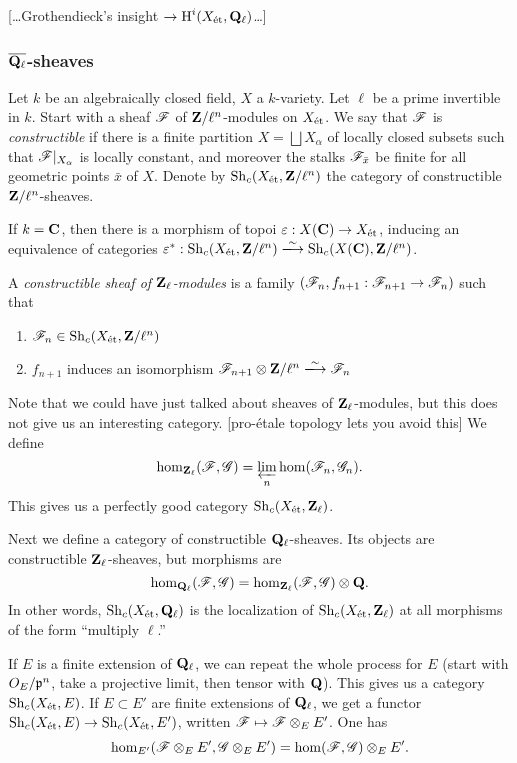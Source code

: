 [\ldots Grothendieck's insight $\to\operatorname{H}^i(X_{\textnormal{\'et}}, \mathbf{Q}_\ell)$\ldots]


\subsubsection{\texorpdfstring{$\overline{\mathbf{Q}_\ell}$}{barQl}-sheaves}

Let $k$ be an algebraically closed field, $X$ a $k$-variety. Let $\ell$ be 
a prime invertible in $k$. Start with a sheaf $\mathscr{F}$ of 
$\mathbf{Z}/\ell^n$-modules on $X_{\textnormal{\'et}}$. We say that $\mathscr{F}$ is \emph{constructible} 
if there is a finite partition $X=\bigsqcup X_\alpha$ of locally closed 
subsets such that $\mathscr{F}|_{X_\alpha}$ is locally constant, and moreover 
the stalks $\mathscr{F}_{\bar x}$ be finite for all geometric points $\bar x$ of $X$. 
Denote by $\operatorname{Sh}_c(X_{\textnormal{\'et}}, \mathbf{Z}/\ell^n)$ the category of constructible 
$\mathbf{Z}/\ell^n$-sheaves. 

If $k=\mathbf{C}$, then there is a morphism of topoi $\varepsilon:X(\mathbf{C}) \to X_{\textnormal{\'et}}$, 
inducing an equivalence of categories 
$\varepsilon^\ast:\sheaf_c(X_\etale,\dZ/\ell^n)\isomorphism \sheaf_c(X(\dC),\dZ/\ell^n)$. 

A \emph{constructible sheaf of $\mathbf{Z}_\ell$-modules} is a family 
$(\mathscr{F}_n,f_{n+1}:\mathscr{F}_{n+1} \to \mathscr{F}_n)$ such that 
\begin{enumerate}
  \item $\mathscr{F}_n\in \operatorname{Sh}_c(X_{\textnormal{\'et}},\mathbf{Z}/\ell^n)$ 
  \item $f_{n+1}$ induces an isomorphism $\sF_{n+1}\otimes \dZ/\ell^n \isomorphism \sF_n$ 
\end{enumerate}
Note that we could have just talked about sheaves of $\mathbf{Z}_\ell$-modules, but 
this does not give us an interesting category. [pro-\'etale topology lets you 
avoid this] We define 
\[
  \hom_{\mathbf{Z}_\ell}(\mathscr{F},\mathscr{G}) = \varprojlim_n \hom(\mathscr{F}_n,\mathscr{G}_n) .
\]
This gives us a perfectly good category $\operatorname{Sh}_c(X_{\textnormal{\'et}},\mathbf{Z}_\ell)$. 

Next we define a category of constructible $\mathbf{Q}_\ell$-sheaves. Its objects are 
constructible $\mathbf{Z}_\ell$-sheaves, but morphisms are 
\[
  \hom_{\mathbf{Q}_\ell}(\mathscr{F},\mathscr{G}) = \hom_{\mathbf{Z}_\ell}(\mathscr{F},\mathscr{G})\otimes \mathbf{Q} .
\]
In other words, $\operatorname{Sh}_c(X_{\textnormal{\'et}},\mathbf{Q}_\ell)$ is the localization of 
$\operatorname{Sh}_c(X_{\textnormal{\'et}},\mathbf{Z}_\ell)$ at all morphisms of the form ``multiply 
$\ell$.'' 

If $E$ is a finite extension of $\mathbf{Q}_\ell$, we can repeat the whole process for 
$E$ (start with $O_E/\mathfrak{p}^n$, take a projective limit, then tensor with $\mathbf{Q}$). This 
gives us a category $\operatorname{Sh}_c(X_{\textnormal{\'et}},E)$. If $E\subset E'$ are finite extensions 
of $\mathbf{Q}_\ell$, we get a functor 
$\operatorname{Sh}_c(X_{\textnormal{\'et}},E) \to \operatorname{Sh}_c(X_{\textnormal{\'et}},E')$, written 
$\mathscr{F}\mapsto \mathscr{F}\otimes_E E'$. One has 
\[
  \hom_{E'}(\mathscr{F}\otimes_E E',\mathscr{G}\otimes_E E') = \hom(\mathscr{F},\mathscr{G})\otimes_E E' .
\]

